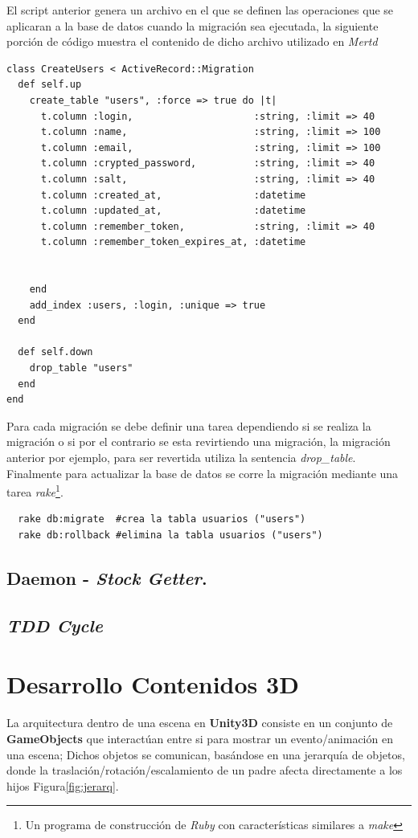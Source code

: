 El script anterior genera un archivo en el que se definen las operaciones que se aplicaran a la base de datos cuando la migración sea ejecutada, la siguiente porción de código muestra el contenido de dicho archivo utilizado en \emph{Mertd}

\begin{verbatim}
class CreateUsers < ActiveRecord::Migration
  def self.up
    create_table "users", :force => true do |t|
      t.column :login,                     :string, :limit => 40
      t.column :name,                      :string, :limit => 100
      t.column :email,                     :string, :limit => 100
      t.column :crypted_password,          :string, :limit => 40
      t.column :salt,                      :string, :limit => 40
      t.column :created_at,                :datetime
      t.column :updated_at,                :datetime
      t.column :remember_token,            :string, :limit => 40
      t.column :remember_token_expires_at, :datetime


    end
    add_index :users, :login, :unique => true
  end

  def self.down
    drop_table "users"
  end
end
\end{verbatim}

Para cada migración se debe definir una tarea dependiendo si se realiza la migración o si por el contrario se esta revirtiendo una migración, la migración anterior por ejemplo, para ser revertida utiliza la sentencia \emph{drop\_table}.\\

Finalmente para actualizar la base de datos se corre la migración mediante una tarea \emph{rake}\footnote{Un programa de construcción de \emph{Ruby} con características similares a \emph{make}}.

\begin{verbatim}
  rake db:migrate  #crea la tabla usuarios ("users")
  rake db:rollback #elimina la tabla usuarios ("users")
\end{verbatim}

\subsection{Daemon - \emph{Stock Getter}.}
\subsection{\emph{TDD Cycle}}

\section{Desarrollo Contenidos 3D}
La arquitectura dentro de una escena en \textbf{Unity3D} consiste en un conjunto de \textbf{GameObjects} que interactúan entre si para mostrar un evento/animación en una escena; Dichos objetos se comunican, basándose en una jerarquía de objetos, donde la traslación/rotación/escalamiento de un padre afecta directamente a los hijos Figura\ref{fig:jerarq}.\\


